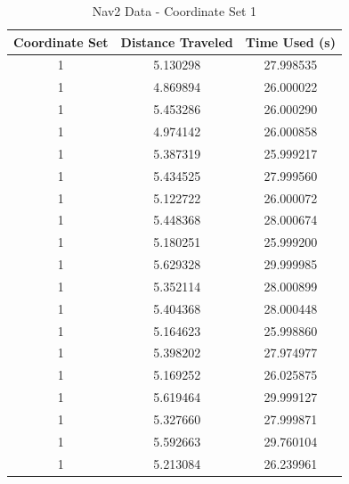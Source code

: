 \documentclass[%
paper=A4,               %
twoside=true,           %
openright,              %
11pt,                   %
bibliography=totoc,     %
titlepage=on,           %
DIV=12,                 %
BCOR=1.5cm,             %
parskip=half,            %
final
]{scrreprt}
\begin{document}
	\begin{table}[h!]
		\centering
		\begin{tabular}{|c|c|c|}
			\hline
			Coordinate Set & Distance Traveled & Time Used (s) \\
			\hline
			1 & 5.130298 & 27.998535 \\
			1 & 4.869894 & 26.000022 \\
			1 & 5.453286 & 26.000290 \\
			1 & 4.974142 & 26.000858 \\
			1 & 5.387319 & 25.999217 \\
			1 & 5.434525 & 27.999560 \\
			1 & 5.122722 & 26.000072 \\
			1 & 5.448368 & 28.000674 \\
			1 & 5.180251 & 25.999200 \\
			1 & 5.629328 & 29.999985 \\
			1 & 5.352114 & 28.000899 \\
			1 & 5.404368 & 28.000448 \\
			1 & 5.164623 & 25.998860 \\
			1 & 5.398202 & 27.974977 \\
			1 & 5.169252 & 26.025875 \\
			1 & 5.619464 & 29.999127 \\
			1 & 5.327660 & 27.999871 \\
			1 & 5.592663 & 29.760104 \\
			1 & 5.213084 & 26.239961 \\
			\hline
		\end{tabular}
		\caption{Nav2 Data - Coordinate Set 1}
		\label{tab:2}
	\end{table}
	
\end{document}
